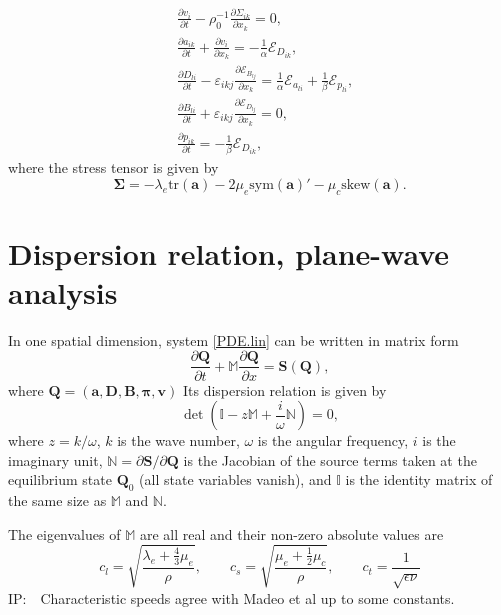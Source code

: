 \documentclass[
10pt, %
a4paper, %
oneside, %
headinclude,footinclude, %
BCOR5mm, %
table,
]{scrartcl}
\newcommand{\vv}{\bm{v}}
\newcommand{\QQ}{\bm{Q}}
\renewcommand{\SS}{\bm{S}}
\newcommand{\calE}{\mathcal{E}}						%
\newcommand{\IP}[1]{{\color{Red}IP:\ \ #1}}
\newcommand{\pd}{\partial}
\newcommand{\distsmall}[2]{ a_{{#1}{#2}} }	%
\newcommand{\Burg}{ \bm{B} }	%
\newcommand{\Durg}{ \bm{D} }	%
\newcommand{\Distsmall}{ \bm{a} }	%
\newcommand{\Plastsmall}{ \bm{\pi} }	%
\newcommand{\symA}{\text{sym}(\bm{a})}
\newcommand{\skewA}{\text{skew}(\bm{a})}
\newcommand{\burg}[1]{ B_{#1} }	%
\newcommand{\veps}{\varepsilon}
\newcommand{\tr}{\text{tr}}
\begin{document}
\begin{subequations}\label{PDE.lin}
    \begin{align}
        &\frac{\pd v_i}{\pd t} - \rho_0^{-1}\frac{ \pd \Sigma_{ik}}{\pd x_k}   = 
        0,\label{PDE.lin.M}\\[2mm]
        &\frac{\pd \distsmall{i}{k}}{\pd t} + \frac{\pd v_i}{\pd x_k} =         
        -\frac{1}{\alpha}\calE_{D_{ik}},\label{PDE.lin.A}\\[2mm]
        &\frac{\pd D_{li}}{\pd t} - \veps_{i k j} \frac{\pd \calE_{B_{l j}}} {\pd x_k} 
        = \frac{1}{\alpha}\calE_{\distsmall{l}{i}} + 
        \frac{1}{\beta}\calE_{p_{l i}},\label{PDE.lin.D}\\[2mm]
        &\frac{\pd \burg{l i}}{\pd t} +  \veps_{ikj} \frac{\pd\calE_{D_{l j}}}{\pd x_k}  = 
        0,\label{PDE.lin.B}\\[2mm]
        &\frac{\pd p_{ik}}{\pd t} = -\frac{1}{\beta}\calE_{D_{ik}},\label{PDE.lin.p}
    \end{align}
\end{subequations}
where the stress tensor is given by
\begin{equation}
\bm{\Sigma} = -\lambda_e\tr(\Distsmall) - 2 \mu_e \symA' - \mu_c \skewA.
\end{equation}

\section{Dispersion relation, plane-wave analysis}

In one spatial dimension, system \eqref{PDE.lin} can be written in matrix form 
\begin{equation}
\frac{\pd \QQ}{\pd t} + \mathbb{M} \frac{\pd\QQ}{\pd x} = \SS(\QQ),
\end{equation}
where $ \QQ = (\Distsmall,\Durg,\Burg,\Plastsmall,\vv)$
Its dispersion relation is given by
\begin{equation}
\det(\mathbb{I} - z \mathbb{M}+\frac{i}{\omega}\mathbb{N}) = 0,
\end{equation}
where $ z = k/\omega $, $ k $ is the wave number, $ \omega $ is the angular frequency,  $ i $ is 
the imaginary unit, $ \mathbb{N} = \pd\SS/\pd\QQ$ is the Jacobian of the source terms taken at the 
equilibrium state $ \QQ_0 $ (all state variables vanish), and $ 
\mathbb{I} $ is the identity matrix of the same size as $ \mathbb{M} $ and $ \mathbb{N} $.

The eigenvalues of $ \mathbb{M} $ are all real and their non-zero absolute values are
\begin{equation}
c_l = \sqrt{\frac{\lambda_e + \frac{4}{3}\mu_e}{\rho}}, \qquad 
%
c_s = \sqrt{\frac{\mu_e + \frac{1}{2}\mu_c}{\rho}}, \qquad 
%
c_t = \frac{1}{\sqrt{\epsilon\nu}}
\end{equation}
\IP{Characteristic speeds agree with Madeo et al \cite{Madeo2015a} up to some constants.}
\end{document}
